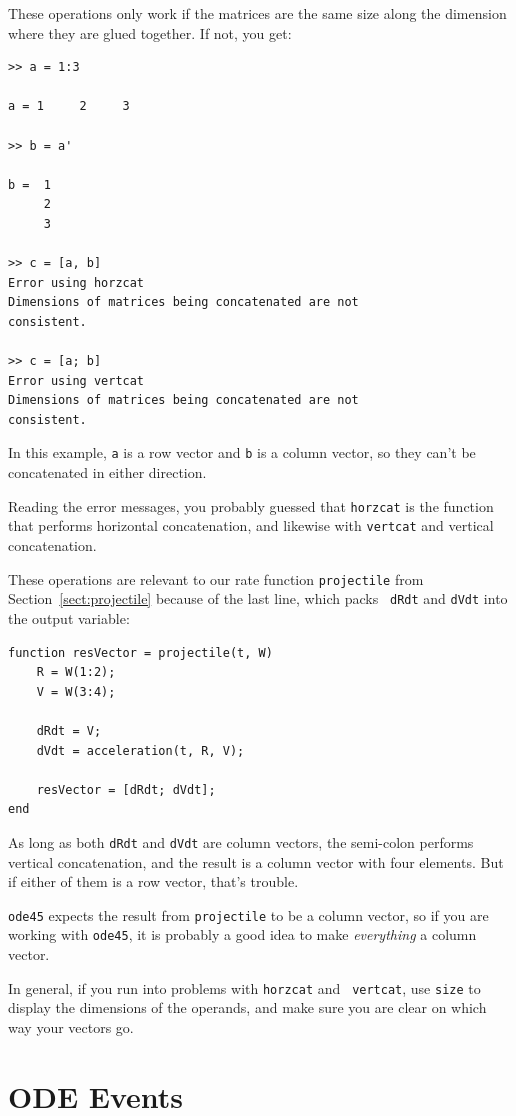 \documentclass[
]{book}
\begin{document}
These operations only work if the matrices are the same size along
the dimension where they are glued together.  If not, you get:

\begin{verbatim}
>> a = 1:3

a = 1     2     3

>> b = a'

b =  1
     2
     3

>> c = [a, b]
Error using horzcat
Dimensions of matrices being concatenated are not
consistent.

>> c = [a; b]
Error using vertcat
Dimensions of matrices being concatenated are not
consistent.
\end{verbatim}

In this example, {\tt a} is a row vector and {\tt b} is a column
vector, so they can't be concatenated in either direction.

Reading the error messages, you probably guessed that {\tt horzcat}
is the function that performs horizontal concatenation, and likewise
with {\tt vertcat} and vertical concatenation.

These operations are relevant to our rate function {\tt projectile} from
Section~\ref{sect:projectile} because of the last line, which packs {\tt
dRdt} and {\tt dVdt} into the output variable:

\begin{verbatim}
function resVector = projectile(t, W)
    R = W(1:2);
    V = W(3:4);

    dRdt = V;
    dVdt = acceleration(t, R, V);

    resVector = [dRdt; dVdt];
end
\end{verbatim}

As long as both {\tt dRdt} and {\tt dVdt} are column vectors,
the semi-colon performs vertical concatenation, and the result is
a column vector with four elements.  But if either of them is a
row vector, that's trouble.

{\tt ode45} expects the result from {\tt projectile} to be a
column vector, so if you are working with {\tt ode45}, it is
probably a good idea to make {\em everything} a column vector.

In general, if you run into problems with {\tt horzcat} and {\tt
vertcat}, use {\tt size} to display the dimensions of the operands,
and make sure you are clear on which way your vectors go.


\section{ODE Events}
\label{sect:events}
\end{document}
